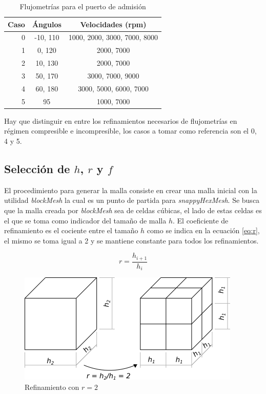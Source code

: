 \documentclass[11pt]{article}
\begin{document}
\begin{table}
    \centering
    \begin{tabular}{rcc} \toprule
        Caso & Ángulos & Velocidades (rpm) \\ \midrule
        0 & -10, 110 & 1000, 2000, 3000, 7000, 8000\\
        1 & 0, 120 & 2000, 7000\\
        2 & 10, 130 & 2000, 7000\\
        3 & 50, 170 & 3000, 7000, 9000\\
        4 & 60, 180 & 3000, 5000, 6000, 7000\\
        5 & 95 & 1000, 7000\\ \bottomrule
    \end{tabular}
    \caption{Flujometrías para el puerto de admisión}
    \label{tab:casos}
\end{table}

Hay que distinguir en entre los refinamientos necesarios de flujometrías en
régimen compresible e incompresible, los casos a tomar como referencia son el
0, 4 y 5.

\subsection{Selección de $h$, $r$ y $f$}
%
El procedimiento para generar la malla consiste en crear una malla inicial con
la utilidad \emph{blockMesh} la cual es un punto de partida para
\emph{snappyHexMesh}.
%
Se busca que la malla creada por \emph{blockMesh} sea de celdas cúbicas, el
lado de estas celdas es el que se toma como indicador del tamaño de malla $h$.
%
El coeficiente de refinamiento es el cociente entre el tamaño $h$ como se
indica en la ecuación \ref{eq:r}, el mismo se toma igual a 2 y se mantiene
constante para todos los refinamientos.

\begin{equation} \label{eq:r}
    r = \frac{h_{i+1}}{h_{i}}
\end{equation}

\begin{figure}
    \centering
    \includegraphics{celdas_block_mesh.png}
    \caption{Refinamiento con $r=2$}
    \label{fig:celdas_bm}
\end{figure}
\end{document}

